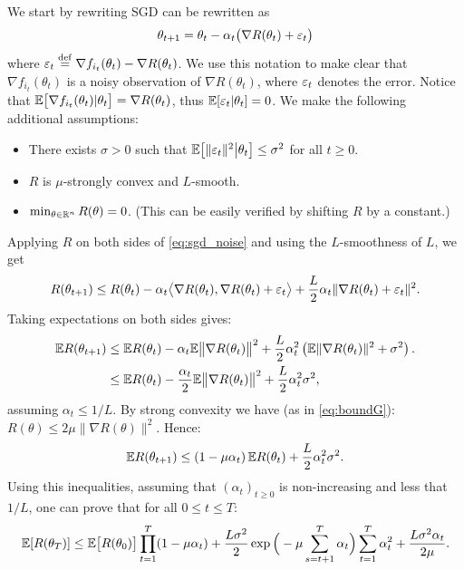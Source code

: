 \documentclass[11pt,nocut]{article}
\begin{document}
We start by rewriting SGD can be rewritten as
\begin{equation}\label{eq:sgd_noise}
\theta_{t+1} = \theta_t - \alpha_t \big(\nabla R(\theta_t) + {\varepsilon}_t \big)
\end{equation}
where ${\varepsilon}_t \overset{\rm def}{=} \nabla f_{i_t}(\theta_t) - \nabla R(\theta_t)$. 
We use this notation to make clear that $\nabla f_{i_t}(\theta_t)$ is a noisy observation of $\nabla R(\theta_t)$, where ${\varepsilon}_t$ denotes the error.
Notice that $\mathbb{E}\big[\nabla f_{i_t}(\theta_t)| \theta_t\big] = \nabla R(\theta_t)$, thus $\mathbb{E}[{\varepsilon}_t|\theta_t] = 0$.
We make the following additional assumptions:
\begin{itemize}
	\item There exists $\sigma>0$ such that $\mathbb{E}\big[\|{\varepsilon}_t\|^2\big|\theta_t\big] \leq \sigma^2$ for all $t \geq 0$.
	\item $R$ is $\mu$-strongly convex and $L$-smooth.
	\item $\min_{\theta \in \mathbb{R}^n} R(\theta) =0$. (This can be easily verified by shifting $R$ by a constant.)
\end{itemize}
\vspace{2mm}
Applying $R$ on both sides of \eqref{eq:sgd_noise} and using the $L$-smoothness of $L$, we get
\begin{align*}
	R(\theta_{t+1}) \leq R(\theta_t) - \alpha_t \big\langle \nabla R(\theta_t), \nabla R(\theta_t) + {\varepsilon}_t \big\rangle + \frac{L}{2} \alpha_t \| \nabla R(\theta_t) + {\varepsilon}_t \|^2.
\end{align*}
Taking expectations on both sides gives:
\begin{align*}
\mathbb{E} R(\theta_{t+1}) 
&\leq \mathbb{E} R(\theta_t) - \alpha_t \mathbb{E} \big\| \nabla R(\theta_t)\big\|^2 + \frac{L}{2}\alpha_t^2 \left( \mathbb{E} \| \nabla R(\theta_t) \|^2 + \sigma^2 \right).
\\
&\leq \mathbb{E} R(\theta_t) - \frac{\alpha_t}{2} \mathbb{E} \big\| \nabla R(\theta_t)\big\|^2 + \frac{L}{2}\alpha_t^2 \sigma^2,
\end{align*}
assuming $\alpha_t \leq 1/L$.
By strong convexity we have (as in \eqref{eq:boundG}): $R(\theta) \leq 2 \mu \|\nabla R(\theta)\|^2$. Hence:
$$
\mathbb{E} R(\theta_{t+1}) \leq \left(1 - \mu \alpha_t\right)\mathbb{E} R(\theta_t)  + \frac{L}{2}\alpha_t^2  \sigma^2 .
$$
Using this inequalities, assuming that $(\alpha_t)_{t \geq 0}$ is non-increasing and less that $1/L$, one can prove that for all $0 \leq t \leq T$:
$$
\mathbb{E} [R(\theta_{T})] \leq \mathbb{E} \big[R(\theta_0)\big] \prod_{t=1}^T (1-\mu \alpha_t) 
+ \frac{L \sigma^2}{2} \exp\Big(-\mu \sum_{s=t+1}^T \alpha_t\Big) \sum_{t=1}^T \alpha_t^2 + \frac{L\sigma^2\alpha_t}{2\mu}.
$$
\end{document}
